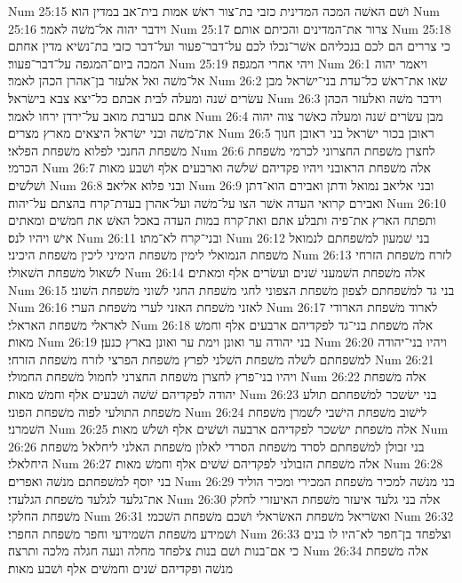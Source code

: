 Num 25:15  ושׁם האשׁה המכה המדינית כזבי בת־צור ראשׁ אמות בית־אב במדין הוא׃
Num 25:16  וידבר יהוה אל־משׁה לאמר׃
Num 25:17  צרור את־המדינים והכיתם אותם׃
Num 25:18  כי צררים הם לכם בנכליהם אשׁר־נכלו לכם על־דבר־פעור ועל־דבר כזבי בת־נשׂיא מדין אחתם המכה ביום־המגפה על־דבר־פעור׃
Num 25:19  ויהי אחרי המגפה׃
Num 26:1  ויאמר יהוה אל־משׁה ואל אלעזר בן־אהרן הכהן לאמר׃
Num 26:2  שׂאו את־ראשׁ כל־עדת בני־ישׂראל מבן עשׂרים שׁנה ומעלה לבית אבתם כל־יצא צבא בישׂראל׃
Num 26:3  וידבר משׁה ואלעזר הכהן אתם בערבת מואב על־ירדן ירחו לאמר׃
Num 26:4  מבן עשׂרים שׁנה ומעלה כאשׁר צוה יהוה את־משׁה ובני ישׂראל היצאים מארץ מצרים׃
Num 26:5  ראובן בכור ישׂראל בני ראובן חנוך משׁפחת החנכי לפלוא משׁפחת הפלאי׃
Num 26:6  לחצרן משׁפחת החצרוני לכרמי משׁפחת הכרמי׃
Num 26:7  אלה משׁפחת הראובני ויהיו פקדיהם שׁלשׁה וארבעים אלף ושׁבע מאות ושׁלשׁים׃
Num 26:8  ובני פלוא אליאב׃
Num 26:9  ובני אליאב נמואל ודתן ואבירם הוא־דתן ואבירם קרואי העדה אשׁר הצו על־משׁה ועל־אהרן בעדת־קרח בהצתם על־יהוה׃
Num 26:10  ותפתח הארץ את־פיה ותבלע אתם ואת־קרח במות העדה באכל האשׁ את חמשׁים ומאתים אישׁ ויהיו לנס׃
Num 26:11  ובני־קרח לא־מתו׃
Num 26:12  בני שׁמעון למשׁפחתם לנמואל משׁפחת הנמואלי לימין משׁפחת הימיני ליכין משׁפחת היכיני׃
Num 26:13  לזרח משׁפחת הזרחי לשׁאול משׁפחת השׁאולי׃
Num 26:14  אלה משׁפחת השׁמעני שׁנים ועשׂרים אלף ומאתים׃
Num 26:15  בני גד למשׁפחתם לצפון משׁפחת הצפוני לחגי משׁפחת החגי לשׁוני משׁפחת השׁוני׃
Num 26:16  לאזני משׁפחת האזני לערי משׁפחת הערי׃
Num 26:17  לארוד משׁפחת הארודי לאראלי משׁפחת האראלי׃
Num 26:18  אלה משׁפחת בני־גד לפקדיהם ארבעים אלף וחמשׁ מאות׃
Num 26:19  בני יהודה ער ואונן וימת ער ואונן בארץ כנען׃
Num 26:20  ויהיו בני־יהודה למשׁפחתם לשׁלה משׁפחת השׁלני לפרץ משׁפחת הפרצי לזרח משׁפחת הזרחי׃
Num 26:21  ויהיו בני־פרץ לחצרן משׁפחת החצרני לחמול משׁפחת החמולי׃
Num 26:22  אלה משׁפחת יהודה לפקדיהם שׁשׁה ושׁבעים אלף וחמשׁ מאות׃
Num 26:23  בני ישׂשכר למשׁפחתם תולע משׁפחת התולעי לפוה משׁפחת הפוני׃
Num 26:24  לישׁוב משׁפחת הישׁבי לשׁמרן משׁפחת השׁמרני׃
Num 26:25  אלה משׁפחת ישׂשכר לפקדיהם ארבעה ושׁשׁים אלף ושׁלשׁ מאות׃
Num 26:26  בני זבולן למשׁפחתם לסרד משׁפחת הסרדי לאלון משׁפחת האלני ליחלאל משׁפחת היחלאלי׃
Num 26:27  אלה משׁפחת הזבולני לפקדיהם שׁשׁים אלף וחמשׁ מאות׃
Num 26:28  בני יוסף למשׁפחתם מנשׁה ואפרים׃
Num 26:29  בני מנשׁה למכיר משׁפחת המכירי ומכיר הוליד את־גלעד לגלעד משׁפחת הגלעדי׃
Num 26:30  אלה בני גלעד איעזר משׁפחת האיעזרי לחלק משׁפחת החלקי׃
Num 26:31  ואשׂריאל משׁפחת האשׂראלי ושׁכם משׁפחת השׁכמי׃
Num 26:32  ושׁמידע משׁפחת השׁמידעי וחפר משׁפחת החפרי׃
Num 26:33  וצלפחד בן־חפר לא־היו לו בנים כי אם־בנות ושׁם בנות צלפחד מחלה ונעה חגלה מלכה ותרצה׃
Num 26:34  אלה משׁפחת מנשׁה ופקדיהם שׁנים וחמשׁים אלף ושׁבע מאות׃
